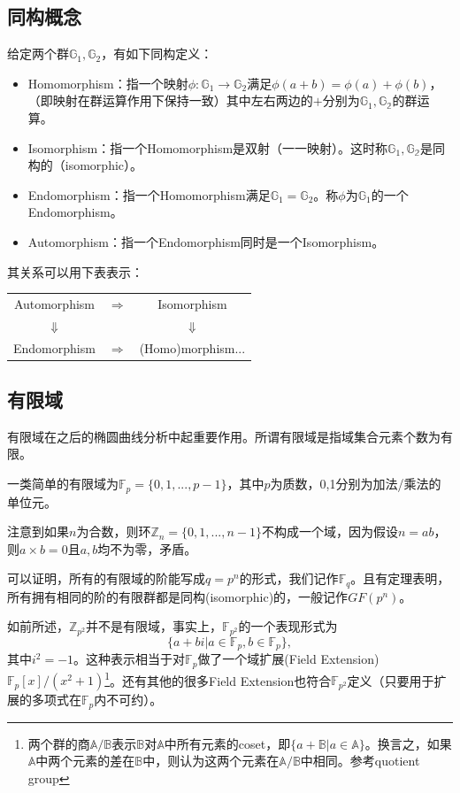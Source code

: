\documentclass[12pt]{article}
\newcommand{\ec}{椭圆曲线}
\newcommand{\fp}{\mathbb{F}_p}
\newcommand{\fq}{\mathbb{F}_q}
\begin{document}
\subsection{同构概念}
给定两个群$\mathbb{G}_1,\mathbb{G}_2$，有如下同构定义：
\begin{itemize}
	\item Homomorphism：指一个映射$\phi: \mathbb{G}_1 \rightarrow \mathbb{G}_2$满足$\phi(a+b)=\phi(a)+\phi(b)$，（即映射在群运算作用下保持一致）其中左右两边的$+$分别为$\mathbb{G}_1, \mathbb{G_2}$的群运算。
	\item Isomorphism：指一个Homomorphism是双射（一一映射）。这时称$\mathbb{G}_1, \mathbb{G_2}$是同构的（isomorphic）。
	\item Endomorphism：指一个Homomorphism满足$\mathbb{G}_1 = \mathbb{G}_2$。称$\phi$为$\mathbb{G}_1$的一个 Endomorphism。
	\item Automorphism：指一个Endomorphism同时是一个Isomorphism。
\end{itemize}
其关系可以用下表表示：
\begin{table}[H]
	\centering
\begin{tabular}{ccc}
	Automorphism  &  $\Rightarrow$	&Isomorphism  \\
	$\Downarrow$  &							& $\Downarrow$ \\
	Endomorphism &  $\Rightarrow$	&(Homo)morphism... \\
\end{tabular}
\end{table}
\subsection{有限域}
有限域在之后的\ec 分析中起重要作用。所谓有限域是指域集合元素个数为有限。

一类简单的有限域为$\fp=\{0,1,...,p-1\}$，其中$p$为质数，0,1分别为加法/乘法的单位元。

注意到如果$n$为合数，则环$\mathbb{Z}_n= \{0,1,...,n-1\}$不构成一个域，因为假设$n=ab$，则$a \times b=0$且$a,b$均不为零，矛盾。

可以证明，所有的有限域的阶能写成$q=p^n$的形式，我们记作$\fq$。且有定理表明，所有拥有相同的阶的有限群都是同构(isomorphic)的，一般记作$GF(p^n)$。

如前所述，$\mathbb{Z}_{p^2}$并不是有限域，事实上，$\mathbb{F}_{p^2}$的一个表现形式为
$$\{ a+bi | a \in \fp, b \in \fp \},$$
其中$i^2 = -1$。这种表示相当于对$\fp$做了一个域扩展(Field Extension)$\fp[x]/(x^2+1)$\footnote{两个群的商$\mathbb{A}/\mathbb{B}$表示$\mathbb{B}$对$\mathbb{A}$中所有元素的coset，即$\{a+\mathbb{B}| a \in \mathbb{A}\}$。换言之，如果$\mathbb{A}$中两个元素的差在$\mathbb{B}$中，则认为这两个元素在$\mathbb{A}/\mathbb{B}$中相同。参考quotient group}。还有其他的很多Field Extension也符合$\mathbb{F}_{p^2}$定义（只要用于扩展的多项式在$\fp$内不可约）。
\end{document}
